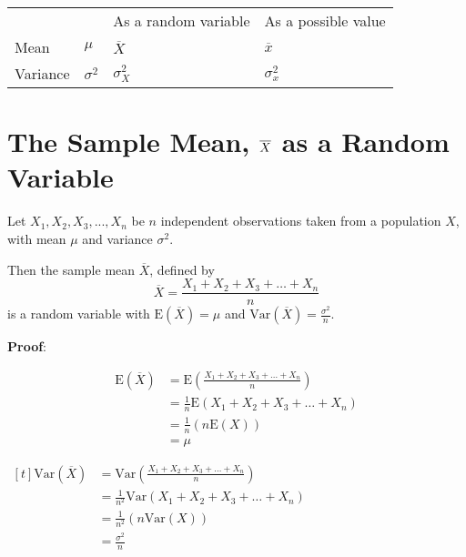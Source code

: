 \documentclass[11pt,a4paper]{book}
\begin{document}
\begin{tabular}{|>{\centering}m{3.5cm}|>{\centering}m{3.5cm}|>{\centering}m{3.5cm}|>{\centering}m{3.5cm}|}
\hline 
\multirow{2}{3.5cm}{\hspace{31bp}Quantity} & \multirow{2}{3.5cm}{\hspace{25bp}Population} & \multicolumn{2}{c|}{Sample}\tabularnewline
\cline{3-4} \cline{4-4} 
 &  & As a random variable & As a possible value\tabularnewline
\hline 
Mean & $\mu$ & $\overline{X}$ & $\overline{x}$\tabularnewline
\hline 
Variance & $\sigma^{2}$ & $\sigma_{X}^{2}$ & $\sigma_{x}^{2}$\tabularnewline
\hline 
\end{tabular}

\newpage


\section{The Sample Mean, $\textbf{\ensuremath{\overline{X}}}$ as a Random Variable}

Let $X_{1},X_{2},X_{3},...,X_{n}$ be $n$ independent observations
taken from a population $X$, with mean $\mu$ and variance $\sigma^{2}$.

Then the sample mean $\overline{X}$, defined by 
\[
\overline{X}=\frac{X_{1}+X_{2}+X_{3}+\ldots+X_{n}}{n}
\]
is a random variable with $\text{E}\left(\overline{X}\right)=\mu$
and ${\displaystyle \text{Var}\left(\overline{X}\right)=\frac{\sigma^{2}}{n}}$.

\begin{fleqn}

\textbf{Proof}:

\begin{minipage}[t]{0.5\textwidth} 

\begin{align*}
\text{E}\left(\overline{X}\right) & =\text{E}\left(\frac{X_{1}+X_{2}+X_{3}+\ldots+X_{n}}{n}\right)\\
 & =\frac{1}{n}\text{E}\left(X_{1}+X_{2}+X_{3}+\ldots+X_{n}\right)\\
 & =\frac{1}{n}\left(n\text{E}\left(X\right)\right)\\
 & =\mu
\end{align*}

\end{minipage}
\hfill\vline\hfill 
\begin{minipage}[t]{0.5\textwidth} 

$
\begin{aligned}[t]
\text{Var}\left(\overline{X}\right) & =\text{Var}\left(\frac{X_{1}+X_{2}+X_{3}+\ldots+X_{n}}{n}\right)\\
 & =\frac{1}{n^{2}}\text{Var}\left(X_{1}+X_{2}+X_{3}+\ldots+X_{n}\right)\\
 & =\frac{1}{n^{2}}\left(n\text{Var}\left(X\right)\right)\\
 & =\frac{\sigma^{2}}{n}
\end{aligned}
$

\end{minipage}

\end{fleqn}
\end{document}
